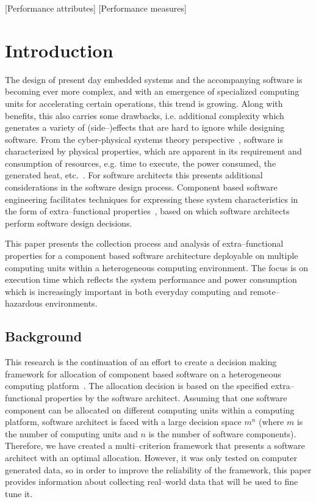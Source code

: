 \documentclass{sig-alternate}
\begin{document}
[Performance attributes]
[Performance measures]



\section{Introduction}

The design of present day embedded systems and the accompanying software is becoming ever more complex, and with an emergence of specialized computing units for accelerating certain operations, this trend is growing. Along with benefits, this also carries some drawbacks, i.e. additional complexity which generates a variety of (side--)effects that are hard to ignore while designing software. From the cyber-physical systems theory perspective~\cite{Wolf2009, Poovendran2010}, software is characterized by physical properties, which are apparent in its requirement and consumption of resources, e.g. time to execute, the power consumed, the generated heat, etc.~\cite{Wolf2012}. For software architects this presents additional considerations in the software design process. Component based software engineering facilitates techniques for expressing these system characteristics in the form of extra--functional properties~\cite{Member2011}, based on which software architects perform software design decisions. 

This paper presents the collection process and analysis of extra--functional properties for a component based software architecture deployable on multiple computing units within a heterogeneous computing environment. The focus is on execution time which reflects the system performance and power consumption which is increasingly important in both everyday computing and remote--hazardous environments.  

\subsection{Background}

This research is the continuation of an effort to create a decision making framework for allocation of component based software on a heterogeneous computing platform~\cite{Svogor2013a}. The allocation decision is based on the specified extra--functional properties by the software architect. Assuming that one software component can be allocated on different computing units within a computing platform, software architect is faced with a large decision space $m^n$ (where $m$ is the number of computing units and $n$ is the number of software components). Therefore, we have created a multi--criterion framework that presents a software architect with an optimal allocation. However, it was only tested on computer generated data, so in order to improve the reliability of the framework, this paper provides information about collecting real--world data that will be used to fine tune it. 
\end{document}
